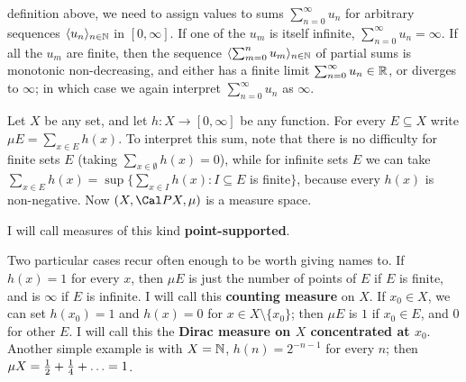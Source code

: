 definition above,
we need to assign values to sums $\sum_{n=0}^{\infty}u_n$ for arbitrary
sequences $\langle u_n\rangle_{n\in\Bbb N}$ in $[0,\infty]$.
If one of the $u_m$ is itself infinite,  $\sum_{n=0}^{\infty}u_n=\infty$.
If all the $u_m$ are finite, then the sequence $\langle\sum_{m=0}^nu_m\rangle_{n\in\Bbb N}$
of partial
sums is monotonic non-decreasing, and either has a finite limit
$\sum_{n=0}^{\infty}u_n\in\Bbb R$, or diverges to $\infty$;  in which
case we again interpret $\sum_{n=0}^{\infty}u_n$ as $\infty$.

   Let $X$ be any set, and let
$h:X\to[0,\infty]$ be any function.   For every $E\subseteq X$ write
$\mu E=\sum_{x\in E}h(x)$.   To interpret this sum, note that there is
no difficulty for
finite sets $E$ (taking $\sum_{x\in\emptyset}h(x)=0$), while for
infinite sets $E$ we can take
$\sum_{x\in E}h(x)=\sup\{\sum_{x\in I}h(x):I\subseteq E$ is finite$\}$,
because
every $h(x)$ is non-negative.      Now $(X,\Cal PX,\mu)$ is a measure space.

 I will call
measures of this kind {\bf point-supported}.

Two particular cases recur often enough to be worth giving names to.
If $h(x)=1$ for every $x$, then $\mu E$
is just the number of points of $E$ if $E$ is finite, and is $\infty$ if
$E$ is infinite.   I will call this {\bf counting measure} on $X$.
If $x_0\in X$, we can set $h(x_0)=1$ and $h(x)=0$ for
$x\in X\setminus\{x_0\}$;  then $\mu E$ is $1$ if $x_0\in E$, and $0$ for
other $E$.   I will call this the
{\bf Dirac measure on $X$ concentrated at $x_0$}.
Another simple example is with $X=\Bbb N$, $h(n)=2^{-n-1}$ for
every $n$;  then $\mu X={1\over 2}+{1\over 4}+\ldots=1$.

